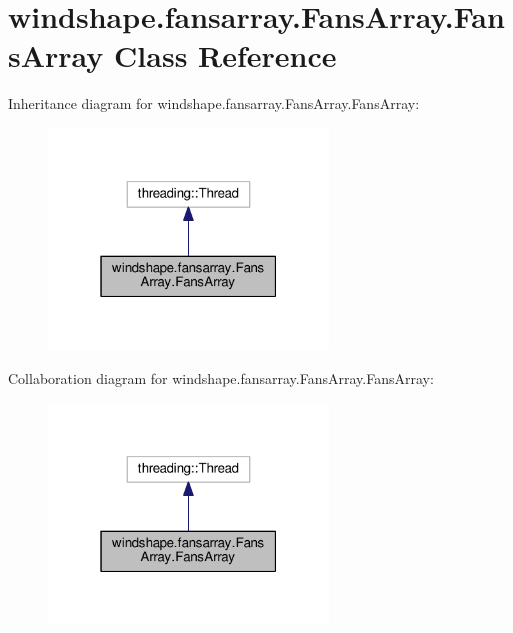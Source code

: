\hypertarget{classwindshape_1_1fansarray_1_1_fans_array_1_1_fans_array}{}\section{windshape.\+fansarray.\+Fans\+Array.\+Fans\+Array Class Reference}
\label{classwindshape_1_1fansarray_1_1_fans_array_1_1_fans_array}


Inheritance diagram for windshape.\+fansarray.\+Fans\+Array.\+Fans\+Array\+:\nopagebreak
\begin{figure}[H]
\begin{center}
\leavevmode
\includegraphics[width=211pt]{classwindshape_1_1fansarray_1_1_fans_array_1_1_fans_array__inherit__graph}
\end{center}
\end{figure}


Collaboration diagram for windshape.\+fansarray.\+Fans\+Array.\+Fans\+Array\+:\nopagebreak
\begin{figure}[H]
\begin{center}
\leavevmode
\includegraphics[width=211pt]{classwindshape_1_1fansarray_1_1_fans_array_1_1_fans_array__coll__graph}
\end{center}
\end{figure}
